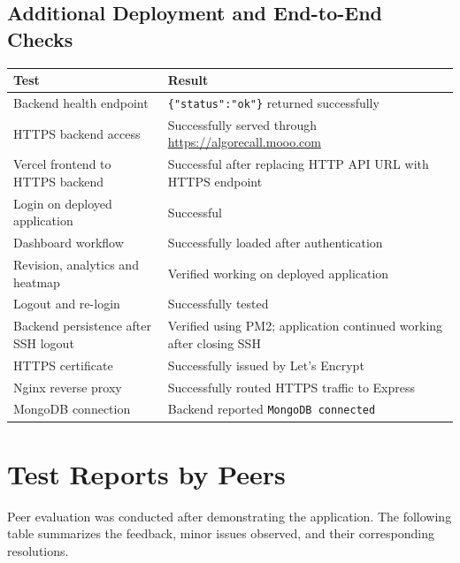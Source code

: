\documentclass[12pt,a4paper]{report}
\begin{document}
\subsection{Additional Deployment and End-to-End Checks}
\begin{longtable}{|p{}|p{}|}
\hline
\textbf{Test} & \textbf{Result}\\\hline
Backend health endpoint & \texttt{\{"status":"ok"\}} returned successfully\\\hline
HTTPS backend access & Successfully served through \url{https://algorecall.mooo.com}\\\hline
Vercel frontend to HTTPS backend & Successful after replacing HTTP API URL with HTTPS endpoint\\\hline
Login on deployed application & Successful\\\hline
Dashboard workflow & Successfully loaded after authentication\\\hline
Revision, analytics and heatmap & Verified working on deployed application\\\hline
Logout and re-login & Successfully tested\\\hline
Backend persistence after SSH logout & Verified using PM2; application continued working after closing SSH\\\hline
HTTPS certificate & Successfully issued by Let's Encrypt\\\hline
Nginx reverse proxy & Successfully routed HTTPS traffic to Express\\\hline
MongoDB connection & Backend reported \texttt{MongoDB connected}\\\hline
\end{longtable}

\section{Test Reports by Peers}

Peer evaluation was conducted after demonstrating the application. The following table summarizes the feedback, minor issues observed, and their corresponding resolutions.
\end{document}
